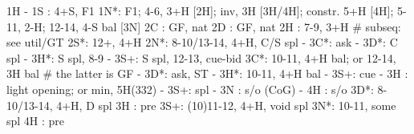 1H -
1S : 4+S, F1
1N*: F1; 4-6, 3+H [2H]; inv, 3H [3H/4H]; constr. 5+H [4H]; 5-11, 2-H; 12-14, 4-S bal [3N]
2C : GF, nat
2D : GF, nat
2H : 7-9, 3+H  # subseq: see util/GT
2S*: 12+, 4+H
2N*: 8-10/13-14, 4+H, C/S spl
   - 3C*: ask
        - 3D*: C spl
        - 3H*: S spl, 8-9
        - 3S+: S spl, 12-13, cue-bid
3C*: 10-11, 4+H bal; or 12-14, 3H bal  # the latter is GF
   - 3D*: ask, ST
        - 3H*: 10-11, 4+H bal
        - 3S+: cue
   - 3H : light opening; or min, 5H(332)
   - 3S+: spl
   - 3N : s/o (CoG)
   - 4H : s/o
3D*: 8-10/13-14, 4+H, D spl
3H : pre
3S+: (10)11-12, 4+H, void spl
3N*: 10-11, some spl
4H : pre